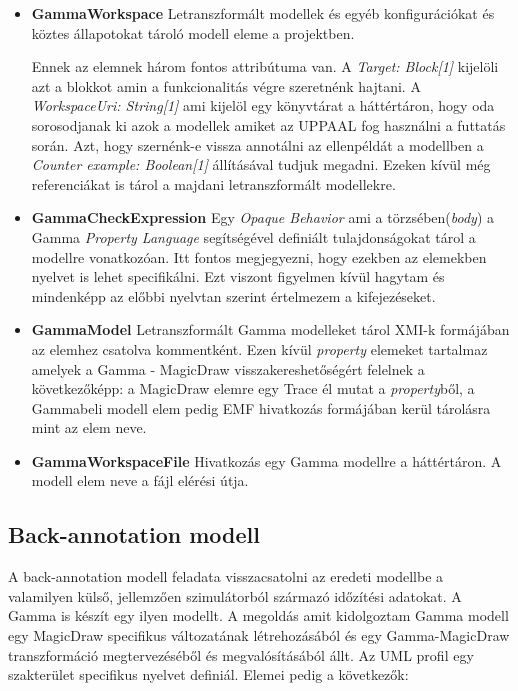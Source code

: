 \begin{itemize}
	\item \textbf{GammaWorkspace} \newline
	Letranszformált modellek és egyéb konfigurációkat és köztes állapotokat tároló modell eleme a projektben.
	
	Ennek az elemnek három fontos attribútuma van. A \emph{Target: Block[1]} kijelöli azt a blokkot amin a funkcionalitás végre szeretnénk hajtani. A \emph{WorkspaceUri: String[1]} ami kijelöl egy könyvtárat a háttértáron, hogy oda sorosodjanak ki azok a modellek amiket az UPPAAL fog használni a futtatás során. Azt, hogy szernénk-e vissza annotálni az ellenpéldát a modellben a \emph{Counter example: Boolean[1]} állításával tudjuk megadni. Ezeken kívül még referenciákat is tárol a majdani letranszformált modellekre.
	
	\item \textbf{GammaCheckExpression} \newline
	Egy \emph{Opaque Behavior} ami a törzsében(\emph{body}) a Gamma \emph{Property Language} segítségével definiált tulajdonságokat tárol a modellre vonatkozóan. Itt fontos megjegyezni, hogy ezekben az elemekben nyelvet is lehet specifikálni. Ezt viszont figyelmen kívül hagytam és mindenképp az előbbi nyelvtan szerint értelmezem a kifejezéseket.

	\item \textbf{GammaModel} \newline
	Letranszformált Gamma modelleket tárol XMI-k formájában az elemhez csatolva kommentként. Ezen kívül \emph{property} elemeket tartalmaz amelyek a Gamma - MagicDraw visszakereshetőségért felelnek a következőképp: a MagicDraw elemre egy Trace él mutat a \emph{property}ből, a Gammabeli modell elem pedig EMF hivatkozás formájában kerül tárolásra mint az elem neve.
	

	\item \textbf{GammaWorkspaceFile} \newline
	Hivatkozás egy Gamma modellre a háttértáron. A modell elem neve a fájl elérési útja.
	
\end{itemize}

\subsection{Back-annotation modell}
A back-annotation modell feladata visszacsatolni az eredeti modellbe a valamilyen külső, jellemzően szimulátorból származó időzítési adatokat. A Gamma is készít egy ilyen modellt. A megoldás amit kidolgoztam Gamma modell egy MagicDraw specifikus változatának létrehozásából és egy Gamma-MagicDraw transzformáció megtervezéséből és megvalósításából állt. Az UML profil egy szakterület specifikus nyelvet definiál. Elemei pedig a következők:

